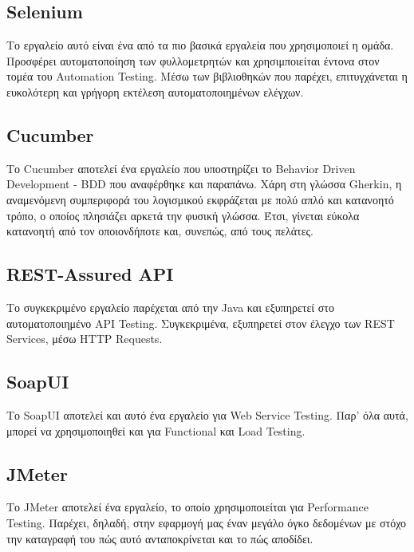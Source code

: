 \subsection*{Selenium}
Το εργαλείο αυτό είναι ένα από τα πιο βασικά εργαλεία που χρησιμοποιεί η ομάδα. Προσφέρει αυτοματοποίηση των φυλλομετρητών και χρησιμποιείται 
έντονα στον τομέα του Automation Testing. Μέσω των βιβλιοθηκών που παρέχει, επιτυγχάνεται η ευκολότερη και γρήγορη εκτέλεση αυτοματοποιημένων 
ελέγχων.
\subsection*{Cucumber}
Το Cucumber αποτελεί ένα εργαλείο που υποστηρίζει το Behavior Driven Development - BDD που αναφέρθηκε και παραπάνω. Χάρη στη γλώσσα Gherkin, η 
αναμενόμενη συμπεριφορά του λογισμικού εκφράζεται με πολύ απλό και κατανοητό τρόπο, ο οποίος πλησιάζει αρκετά την φυσική γλώσσα. Έτσι, γίνεται 
εύκολα κατανοητή από τον οποιονδήποτε και, συνεπώς, από τους πελάτες.
\subsection*{REST-Assured API}
Το συγκεκριμένο εργαλείο παρέχεται από την Java και εξυπηρετεί στο αυτοματοποιημένο API Testing. Συγκεκριμένα, εξυπηρετεί στον έλεγχο των REST 
Services, μέσω HTTP Requests.
\subsection*{SoapUI}
Το SoapUI αποτελεί και αυτό ένα εργαλείο για Web Service Testing. Παρ' όλα αυτά, μπορεί να χρησιμοποιηθεί και για Functional και Load Testing.
\subsection*{JMeter}
Το JMeter αποτελεί ένα εργαλείο, το οποίο χρησιμοποιείται για Performance Testing. Παρέχει, δηλαδή, στην εφαρμογή μας έναν μεγάλο όγκο 
δεδομένων με στόχο την καταγραφή του πώς αυτό ανταποκρίνεται και το πώς αποδίδει.